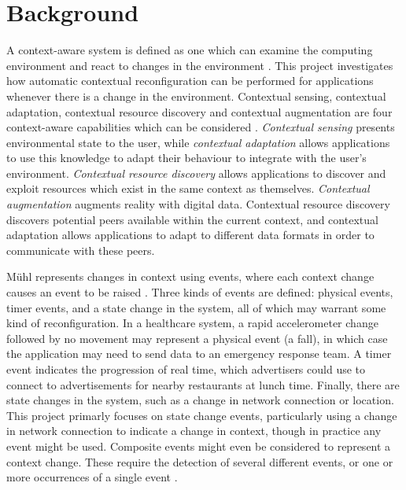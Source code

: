 \documentclass[12pt,twoside,notitlepage]{report}
\begin{document}
\section{Background}

A context-aware system is defined as one which can examine the computing environment and react to changes in the environment \cite{schilit1994context}. 
This project investigates how automatic contextual reconfiguration can be performed for applications whenever there is a change in the environment. 
Contextual sensing, contextual adaptation, contextual resource discovery and contextual augmentation are four context-aware capabilities which can be considered \cite{pascoe1998adding}.
{\sl Contextual sensing} presents environmental state to the user, while {\sl contextual adaptation} allows applications to use this knowledge to adapt their behaviour to integrate with the user's environment.
{\sl Contextual resource discovery} allows applications to discover and exploit resources which exist in the same context as themselves. 
{\sl Contextual augmentation} augments reality with digital data. 
Contextual resource discovery discovers potential peers available within the current context, and contextual adaptation allows applications to adapt to different data formats in order to communicate with these peers. 


M\"{u}hl represents changes in context using events, where each context change causes an event to be raised \cite[p11]{muhl2006distributed}.
Three kinds of events are defined: physical events, timer events, and a state change in the system, all of which may warrant some kind of reconfiguration. 
In a healthcare system, a rapid accelerometer change followed by no movement may represent a physical event (a fall), in which case the application may need to send data to an emergency response team.
A timer event indicates the progression of real time, which advertisers could use to connect to advertisements for nearby restaurants at lunch time. 
Finally, there are state changes in the system, such as a change in network connection or location. 
This project primarly focuses on state change events, particularly using a change in network connection to indicate a change in context, though in practice any event might be used.  
Composite events might even be considered to represent a context change. 
These require the detection of several different events, or one or more occurrences of a single event \cite{chakravarthy1994composite}. 
\end{document}
